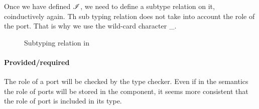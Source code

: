 Once we have defined $\mathcal{I}$, we need to define a subtype relation on it, coinductively again. Th sub typing relation does not take into account the role of the port. That is why we use the wild-card character \_.

\begin{figure}[ht!]
\caption{Subtyping relation  in \compo{}}
\end{figure}


\paragraph{Provided/required}
The role of a port will be checked by the type checker. Even if in the semantics the role of ports will be stored in the component, it seems more consistent that the role of port is included in its type.
